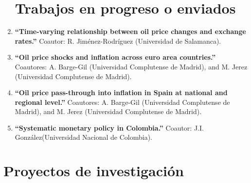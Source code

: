 \documentclass[11pt]{article}\usepackage[]{graphicx}\usepackage[]{color}
\begin{document}
\begin{enumerate}
\noindent
\section{Trabajos en progreso o enviados}

\item \textbf{``Time-varying relationship between oil price changes and exchange rates.''} Coautor: R. Jiménez-Rodríguez (Universidad de Salamanca).

\item \textbf{``Oil price shocks and inflation across euro area countries.''} Coautores: A. Barge-Gil (Universidad Complutense de Madrid), and M. Jerez (Universidad Complutense de Madrid).

\item \textbf{``Oil price pass-through into inflation in Spain at national and regional level.''} Coautores: A. Barge-Gil (Universidad Complutense de Madrid), and M. Jerez (Universidad Complutense de Madrid).

\item \textbf{``Systematic monetary policy in Colombia.''} Coautor: J.I. González(Universidad Nacional de Colombia).
\\
\end{enumerate}

\section{Proyectos de investigación} 
\end{document}
